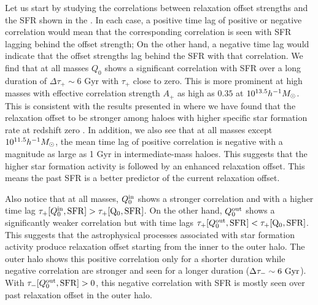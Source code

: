 Let us start by studying the correlations between relaxation offset strengths and the SFR shown in the . In each case, a positive time lag of positive or negative correlation would mean that the corresponding correlation is seen with SFR lagging behind the offset strength; On the other hand, a negative time lag would indicate that the offset strengths lag behind the SFR with that correlation. We find that at all masses $Q_0$ shows a significant correlation with SFR over a long duration of $\Delta \tau_{+}\sim 6$ Gyr with $\tau_{+}$ close to zero. This is more prominent at high masses with effective correlation strength $A_{+}$ as high as $0.35$ at $10^{13.5} h^{-1}M_{\odot}$. This is consistent with the results presented in   where we have found that the relaxation offset to be stronger among haloes with higher specific star formation rate at redshift zero . In addition, we also see that at all masses except $10^{11.5}h^{-1}M_{\odot}$, the mean time lag of positive correlation is negative with a magnitude as large as 1 Gyr in intermediate-mass haloes. This suggests that the higher star formation activity is followed by an enhanced relaxation offset. This means the past SFR is a better  predictor of the current relaxation offset.

Also notice that at all masses, $Q_0^{\rm{in}}$ shows a stronger correlation and with a higher time lag $\tau_{+}[Q_0^{\rm{in}},\rm{SFR}] > \tau_{+}[Q_0,\rm{SFR}]$. On the other hand, $Q_0^{\rm{out}}$ shows a significantly weaker correlation but with time lags $\tau_{+}[Q_0^{\rm{out}},\rm{SFR}] < \tau_{+}[Q_0,\rm{SFR}]$. This suggests that the astrophysical processes associated with star formation activity produce relaxation offset starting from the inner to the outer halo. The outer halo shows this positive correlation only for a shorter duration while negative correlation are stronger and seen for a longer duration ($\Delta \tau_{-}\sim 6 ~\rm{Gyr}$). With $\tau_{-}[Q_0^{\rm{out}},\rm{SFR}]>0$, this negative correlation with SFR is mostly seen over past relaxation offset in the outer halo.


